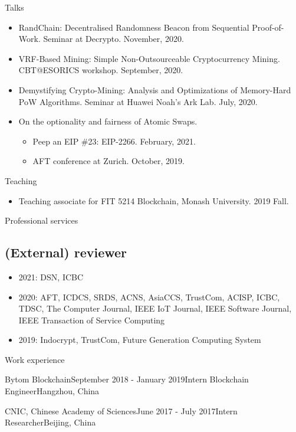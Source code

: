 \documentclass{resume} %
\begin{document}
\begin{rSection}{Talks}
    \begin{itemize}
        \item RandChain: Decentralised Randomness Beacon from Sequential Proof-of-Work. Seminar at Decrypto. November, 2020.
        \item VRF-Based Mining: Simple Non-Outsourceable Cryptocurrency Mining. CBT@ESORICS workshop. September, 2020.
        \item Demystifying Crypto-Mining: Analysis and Optimizations of Memory-Hard PoW Algorithms. Seminar at Huawei Noah's Ark Lab. July, 2020.
        \item On the optionality and fairness of Atomic Swaps.
              \begin{itemize}
                  \item Peep an EIP \#23: EIP-2266. February, 2021.
                  \item AFT conference at Zurich. October, 2019.
              \end{itemize}
    \end{itemize}
\end{rSection}


\begin{rSection}{Teaching}
    \begin{itemize}
        \item Teaching associate for FIT 5214 Blockchain, Monash University. 2019 Fall.
    \end{itemize}
\end{rSection}


\begin{rSection}{Professional services}
    \subsection*{(External) reviewer}
    \begin{itemize}
        \item 2021: DSN, ICBC
        \item 2020: AFT, ICDCS, SRDS, ACNS, AsiaCCS, TrustCom, ACISP, ICBC, TDSC, The Computer Journal, IEEE IoT Journal, IEEE Software Journal, IEEE Transaction of Service Computing
        \item 2019: Indocrypt, TrustCom, Future Generation Computing System
    \end{itemize}
\end{rSection}

\begin{rSection}{Work experience}

    \begin{rSubsubsection}{Bytom Blockchain}{September 2018 - January 2019}{Intern Blockchain Engineer}{Hangzhou, China}
    \end{rSubsubsection}

    \begin{rSubsubsection}{CNIC, Chinese Academy of Sciences}{June 2017 - July 2017}{Intern Researcher}{Beijing, China}
    \end{rSubsubsection}

\end{rSection}
\end{document}
